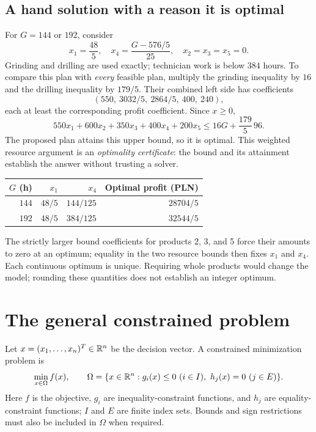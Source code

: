 \documentclass[11pt,a4paper]{article}
\begin{document}
\subsection{A hand solution with a reason it is optimal}
For $G=144$ or $192$, consider
\[
  x_1=\frac{48}{5},\quad x_4=\frac{G-576/5}{25},\quad x_2=x_3=x_5=0.
\]
Grinding and drilling are used exactly; technician work is below $384$ hours.
To compare this plan with \emph{every} feasible plan, multiply the grinding
inequality by $16$ and the drilling inequality by $179/5$. Their combined
left side has coefficients
\[
  (550,\ 3032/5,\ 2864/5,\ 400,\ 240),
\]
each at least the corresponding profit coefficient. Since $x\geq0$,
\[
  550x_1+600x_2+350x_3+400x_4+200x_5
  \leq16G+\frac{179}{5}\,96.
\]
The proposed plan attains this upper bound, so it is optimal. This weighted
resource argument is an \emph{optimality certificate}: the bound and its
attainment establish the answer without trusting a solver.
\begin{center}
  \begin{tabular}{rrrr}\toprule
    $G$ (h) & $x_1$ & $x_4$ & Optimal profit (PLN)\\\midrule
    $144$ & $48/5$ & $144/125$ & $28704/5$\\
    $192$ & $48/5$ & $384/125$ & $32544/5$\\\bottomrule
  \end{tabular}
\end{center}
The strictly larger bound coefficients for products 2, 3, and 5 force their
amounts to zero at an optimum; equality in the two resource bounds then fixes
$x_1$ and $x_4$. Each continuous optimum is unique. Requiring whole products
would change the model; rounding these quantities does not establish an integer optimum.

\section{The general constrained problem}\label{sec:general}
Let $x=(x_1,\ldots,x_n)^T\in\mathbb{R}^n$ be the decision vector. A constrained
minimization problem is
\begin{equation}\label{eq:general}
  \min_{x\in\Omega} f(x),\qquad
  \Omega=\{x\in\mathbb{R}^n:g_i(x)\leq0\ (i\in I),\ h_j(x)=0\ (j\in E)\}.
\end{equation}
Here $f$ is the objective, $g_i$ are inequality-constraint functions, and $h_j$
are equality-constraint functions; $I$ and $E$ are finite index sets. Bounds and
sign restrictions must also be included in $\Omega$ when required.
\end{document}
